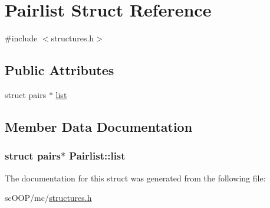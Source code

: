 \hypertarget{struct_pairlist}{\section{Pairlist Struct Reference}
\label{struct_pairlist}
}


{\ttfamily \#include $<$structures.\+h$>$}

\subsection*{Public Attributes}
\begin{DoxyCompactItemize}
\item 
struct pairs $\ast$ \hyperlink{struct_pairlist_a11fdf14dd49a7574007dd6d4d2d7528b}{list}
\end{DoxyCompactItemize}


\subsection{Member Data Documentation}
\hypertarget{struct_pairlist_a11fdf14dd49a7574007dd6d4d2d7528b}{
\subsubsection[{list}]{\setlength{\rightskip}{0pt plus 5cm}struct pairs$\ast$ Pairlist\+::list}}\label{struct_pairlist_a11fdf14dd49a7574007dd6d4d2d7528b}


The documentation for this struct was generated from the following file\+:\begin{DoxyCompactItemize}
\item 
sc\+O\+O\+P/mc/\hyperlink{structures_8h}{structures.\+h}\end{DoxyCompactItemize}
